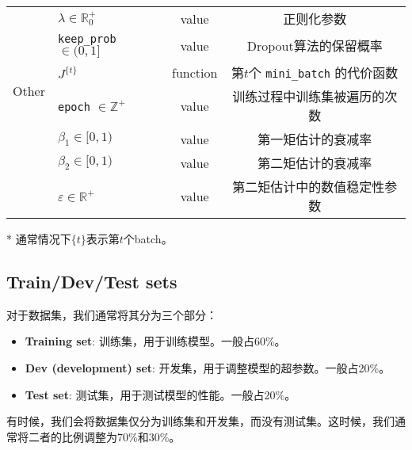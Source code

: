 \begin{table}[htb!]
\begin{threeparttable}
\begin{tabular}{clcc}
        \midrule
        \multirow{6}{*}{Other}      & $\lambda \in \mathbb{R}^+_0$                                                          & value                & 正则化参数                                                             \\  
                                    & \verb|keep_prob| $\in (0,1]$                                                          & value                & Dropout算法的保留概率                                                   \\ 
                                    & $J^{\{t\}}$                                                                           & function             & 第$t$个 \verb|mini_batch| 的代价函数                                   \\  
                                    & \verb|epoch| $\in \mathbb{Z}^+$                                                       & value                & 训练过程中训练集被遍历的次数                                           \\
                                    & $\beta_1 \in [0,1)$                                                                   & value                & 第一矩估计的衰减率 \\ 
                                    & $\beta_2 \in [0,1)$                                                                   & value                & 第二矩估计的衰减率                                                    \\ 
                                    & $\varepsilon \in \mathbb{R}^+$                                                        & value                & 第二矩估计中的数值稳定性参数                                            \\
        \bottomrule
    \end{tabular}
    \label{tab:notations-chap2} %
    \begin{tablenotes}
        \item[*] 通常情况下${\{t\}}$表示第$t$个batch。
    \end{tablenotes}
    \end{threeparttable}
\end{table}

\subsection{Train/Dev/Test sets}
对于数据集，我们通常将其分为三个部分：
\begin{itemize}
    \item \textbf{Training set}: 训练集，用于训练模型。一般占60\%。
    \item \textbf{Dev (development) set}: 开发集，用于调整模型的超参数。一般占20\%。
    \item \textbf{Test set}: 测试集，用于测试模型的性能。一般占20\%。
\end{itemize}
有时候，我们会将数据集仅分为训练集和开发集，而没有测试集。这时候，我们通常将二者的比例调整为70\%和30\%。


